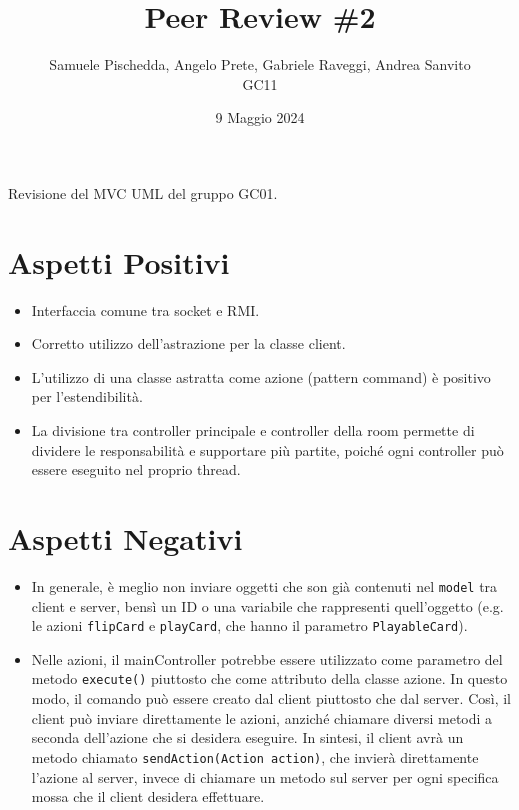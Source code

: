 \documentclass{article}
\title{Peer Review \#2}
\author{Samuele Pischedda, Angelo Prete, Gabriele Raveggi, Andrea Sanvito\\GC11}
\date{9 Maggio 2024}
\begin{document}
    \maketitle

    Revisione del MVC UML del gruppo GC01.

    \section{Aspetti Positivi}
    \begin{itemize}
        \item Interfaccia comune tra socket e RMI.
        \item Corretto utilizzo dell'astrazione per la classe client.
        \item L'utilizzo di una classe astratta come azione (pattern command) è positivo per l'estendibilità.
        \item La divisione tra controller principale e controller della room permette di dividere le responsabilità e
        supportare più partite, poiché ogni controller può essere eseguito nel proprio thread.
    \end{itemize}

    \section{Aspetti Negativi}
    \begin{itemize}
        \item In generale, è meglio non inviare oggetti che son già contenuti nel \texttt{model} tra client e server, bensì un ID o una variabile che rappresenti quell'oggetto (e.g. le azioni \texttt{flipCard} e \texttt{playCard}, che hanno il parametro \texttt{PlayableCard}).
        \item Nelle azioni, il mainController potrebbe essere utilizzato come parametro del metodo \texttt{execute()} piuttosto che come attributo della classe azione.
        In questo modo, il comando può essere creato dal client piuttosto che dal server.
        Così, il client può inviare direttamente le azioni, anziché chiamare diversi metodi a seconda dell'azione che si desidera eseguire.
        In sintesi, il client avrà un metodo chiamato \texttt{sendAction(Action action)}, che invierà direttamente l'azione al server, invece di chiamare un metodo sul server per ogni specifica mossa che il client desidera effettuare.
    \end{itemize}
\end{document}
